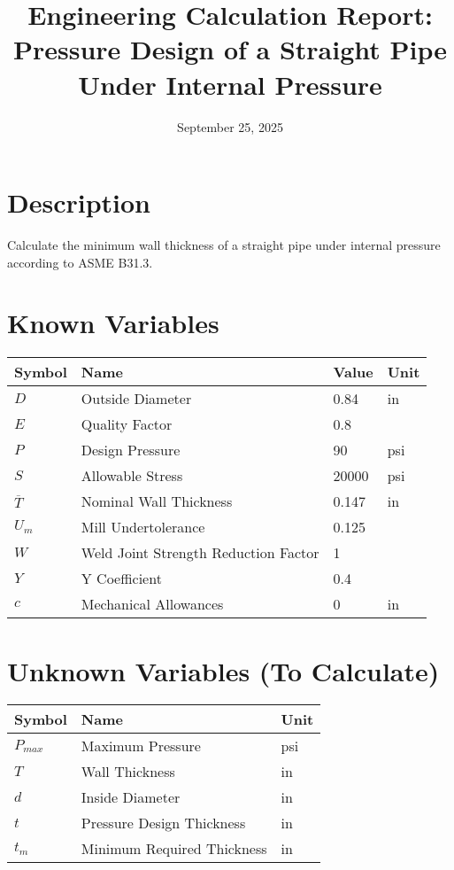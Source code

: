 \documentclass[11pt,a4paper]{article}
\title{Engineering Calculation Report: Pressure Design of a Straight Pipe Under Internal Pressure}
\date{September 25, 2025}
\begin{document}
\maketitle

\section*{Description}
Calculate the minimum wall thickness of a straight pipe under internal pressure according to ASME B31.3.

\section{Known Variables}

\begin{longtable}{llll}
\toprule
Symbol & Name & Value & Unit \\
\midrule
\endhead
$D$ & Outside Diameter & 0.84 & in \\
$E$ & Quality Factor & 0.8 &  \\
$P$ & Design Pressure & 90 & psi \\
$S$ & Allowable Stress & 20000 & psi \\
$\overline{T}$ & Nominal Wall Thickness & 0.147 & in \\
$U_{m}$ & Mill Undertolerance & 0.125 &  \\
$W$ & Weld Joint Strength Reduction Factor & 1 &  \\
$Y$ & Y Coefficient & 0.4 &  \\
$c$ & Mechanical Allowances & 0 & in \\
\bottomrule
\end{longtable}

\section{Unknown Variables (To Calculate)}

\begin{longtable}{lll}
\toprule
Symbol & Name & Unit \\
\midrule
\endhead
$P_{max}$ & Maximum Pressure & psi \\
$T$ & Wall Thickness & in \\
$d$ & Inside Diameter & in \\
$t$ & Pressure Design Thickness & in \\
$t_{m}$ & Minimum Required Thickness & in \\
\bottomrule
\end{longtable}
\end{document}
